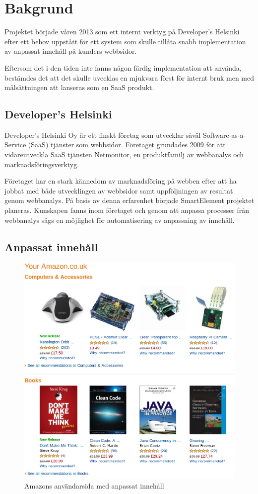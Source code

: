 \section{Bakgrund}

Projektet började våren 2013 som ett internt verktyg på Developer's Helsinki efter ett behov uppstått för ett system som skulle tillåta snabb implementation av anpassat innehåll på kunders webbsidor.

Eftersom det i den tiden inte fanns någon färdig implementation att använda, bestämdes det att det skulle uvecklas en mjukvara först för internt bruk men med målsättningen att lanseras som en SaaS produkt.

\subsection{Developer's Helsinki}

Developer's Helsinki Oy är ett finskt företag som utvecklar såväl Software-as-a-Service (SaaS) tjänster som webbsidor. Företaget grundades 2009 för att vidareutveckla  SaaS tjänsten Netmonitor, en produktfamilj av webbanalys och marknadsföringsverktyg.

Företaget har en stark kännedom av marknadsföring på webben efter att ha jobbat med både utvecklingen av webbsidor samt uppföljningen av resultat genom webbanalys. På basis av denna erfarenhet började SmartElement projektet planeras. Kunskapen fanns inom företaget och genom att anpassa processer från webbanalys sågs en möjlighet för automatisering av anpassning av innehåll.

\subsection{Anpassat innehåll}

\begin{figure}[h!]
\centering
\includegraphics[width=120mm]{assets/images/amazon.png}
\caption{Amazons användarsida med anpassat innehåll}
\label{amazon}
\end{figure}

